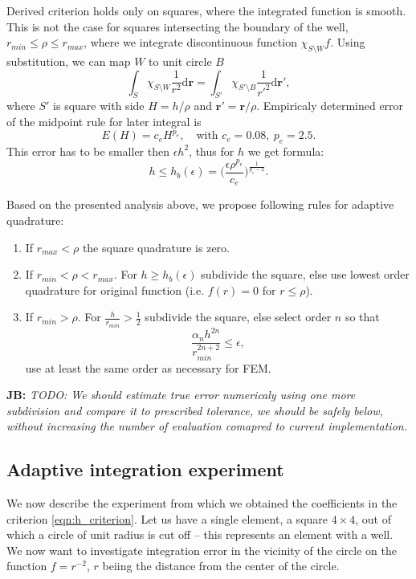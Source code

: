 \documentclass[preprint,12pt]{elsarticle}
\def\vc#1{\mathbf{\boldsymbol{#1}}}     %
\def\d{\mathrm{d}}
\newcommand{\noteJB}[1]{{\color{Blue} \textbf{JB: } \textit{#1}}}
\begin{document}
Derived criterion holds only on squares, where the integrated function is smooth.
This is not the case for squares intersecting the boundary of the well, $r_{min} \le \rho \le r_{max}$, where we integrate 
discontinuous function $\chi_{S \setminus W} f$. Using substitution, we can map $W$ to unit circle $B$
\[
  \int_{S} \chi_{S \setminus W} \frac{1}{r^2} \d \vc r= \int_{S'} \chi_{S' \setminus B} \frac{1}{r'^2} \d \vc {r'},
\]
where $S'$ is square with side $H=h/\rho$ and $\vc {r'} = \vc{r}/\rho$. Empiricaly determined error of the midpoint rule for later 
integral is
\[
    E(H) = c_e H^{p_e}, \quad \text{with } c_e=0.08,\ p_e=2.5.
\]
This error has to be smaller then $\epsilon h^2$, thus for $h$ we get formula:
\begin{equation} \label{eqn:h_criterion}
   h\le h_b(\epsilon) = \Big(\frac{\epsilon \rho^{p_e}}{c_e}\Big)^{\frac{1}{p_e-2}}. 
\end{equation}


Based on the presented analysis above, we propose following rules for adaptive quadrature:
\begin{enumerate}
 \item If $r_{max} < \rho$ the square quadrature is zero.
 \item If $r_{min} < \rho < r_{max}$. For $h \ge h_b(\epsilon)$ subdivide the square, else use lowest order quadrature for 
original function (i.e. $f(r)=0$ for $r\le \rho$).
 \item If $r_{min} > \rho$. For $\frac{h}{r_{min}} > \frac{1}{2}$ subdivide the square, else select order $n$ so that 
 \begin{equation} \label{eqn:alpha_criterion}
    \frac{\alpha_n h^{2n}}{r_{min}^{2n+2}} \le \epsilon,
 \end{equation}
 use at least the same order as necessary for FEM.
\end{enumerate}

\noteJB{TODO:
We should estimate true error numericaly using one more subdivision and compare it to prescribed tolerance, we should be safely 
below, without increasing the number of evaluation comapred to current implementation.
}


\subsection{Adaptive integration experiment}
We now describe the experiment from which we obtained the coefficients in the criterion 
\eqref{eqn:h_criterion}. Let us have a single element, a square $4\times4$, out of which a circle of unit radius 
is cut off -- this represents an element with a well. We now want to investigate integration error
in the vicinity of the circle on the function $f=r^{-2}$, $r$ beiing the distance from the center of the circle. 
\end{document}
